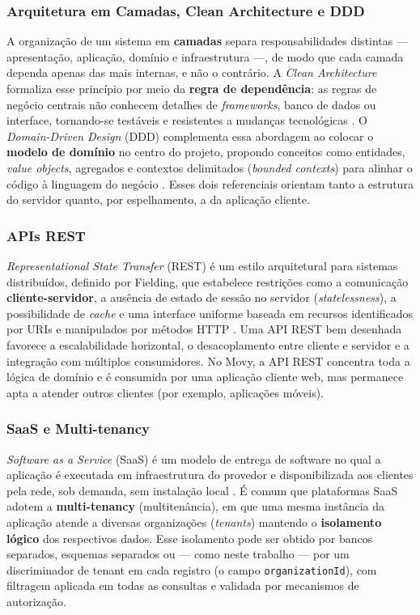 \subsubsection{Arquitetura em Camadas, Clean Architecture e DDD}

A organização de um sistema em \textbf{camadas} separa responsabilidades
distintas --- apresentação, aplicação, domínio e infraestrutura ---, de modo
que cada camada dependa apenas das mais internas, e não o contrário. A
\textit{Clean Architecture} formaliza esse princípio por meio da
\textbf{regra de dependência}: as regras de negócio centrais não conhecem
detalhes de \textit{frameworks}, banco de dados ou interface, tornando-se
testáveis e resistentes a mudanças tecnológicas \cite{martin2017}. O
\textit{Domain-Driven Design} (DDD) complementa essa abordagem ao colocar o
\textbf{modelo de domínio} no centro do projeto, propondo conceitos como
entidades, \textit{value objects}, agregados e contextos delimitados
(\textit{bounded contexts}) para alinhar o código à linguagem do negócio
\cite{evans2003}. Esses dois referenciais orientam tanto a estrutura do
servidor quanto, por espelhamento, a da aplicação cliente.

\subsubsection{APIs REST}

\textit{Representational State Transfer} (REST) é um estilo arquitetural para
sistemas distribuídos, definido por Fielding, que estabelece restrições como
a comunicação \textbf{cliente-servidor}, a ausência de estado de sessão no
servidor (\textit{statelessness}), a possibilidade de \textit{cache} e uma
interface uniforme baseada em recursos identificados por URIs e manipulados
por métodos HTTP \cite{fielding2000}. Uma API REST bem desenhada favorece a
escalabilidade horizontal, o desacoplamento entre cliente e servidor e a
integração com múltiplos consumidores. No Movy, a API REST concentra toda a
lógica de domínio e é consumida por uma aplicação cliente web, mas permanece
apta a atender outros clientes (por exemplo, aplicações móveis).

\subsubsection{SaaS e Multi-tenancy}

\textit{Software as a Service} (SaaS) é um modelo de entrega de software no
qual a aplicação é executada em infraestrutura do provedor e disponibilizada
aos clientes pela rede, sob demanda, sem instalação local \cite{nist800145}. É
comum que plataformas SaaS adotem a \textbf{multi-tenancy} (multitenância), em
que uma mesma instância da aplicação atende a diversas organizações
(\textit{tenants}) mantendo o \textbf{isolamento lógico} dos respectivos
dados. Esse isolamento pode ser obtido por bancos separados, esquemas
separados ou --- como neste trabalho --- por um discriminador de tenant em
cada registro (o campo \texttt{organizationId}), com filtragem aplicada em
todas as consultas e validada por mecanismos de autorização.


